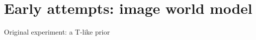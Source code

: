 \section{Early attempts: image world model}

\begin{frame}{Original experiment: a T-like prior}
\end{frame}

